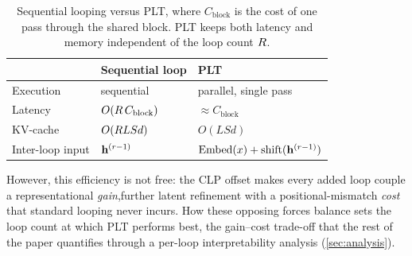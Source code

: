 \begin{table}[t]
\centering
\caption{Sequential looping versus PLT, where $C_{\text{block}}$ is the cost of
one pass through the shared block. PLT keeps both latency and memory independent
of the loop count $R$.}
\label{tab:loop-vs-plt}
\begin{tabular}{lll}
\toprule
 & \textbf{Sequential loop} & \textbf{PLT} \\
\midrule
Execution        & sequential                        & parallel, single pass \\
Latency          & $O(R\,C_{\text{block}})$  & $\approx C_{\text{block}}$ \\
KV-cache         & $O(R L S d)$              & $O(L S d)$ \\
Inter-loop input & $\mathbf{h}^{(r-1)}$                  & $\mathrm{Embed}(x) + \mathrm{shift}(\mathbf{h}^{(r-1)})$ \\
\bottomrule
\end{tabular}
\end{table}

However, this efficiency is not free: the CLP offset 
makes every added loop couple a representational \emph{gain},further latent
refinement with a positional-mismatch \emph{cost} that standard looping never
incurs.
How these opposing forces balance sets the loop count at which PLT performs
best, the gain--cost trade-off that the rest of the paper quantifies through a
per-loop interpretability analysis (\autoref{sec:analysis}).
